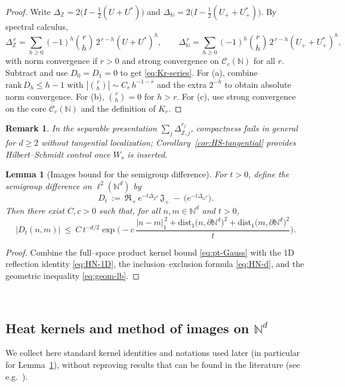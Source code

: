 \documentclass[10pt]{amsart}
\newcommand{\Z}{{\mathbb{Z}}}
\newcommand{\N}{{\mathbb{N}}}
\newcommand{\1}{{\mathbb{I}}}
\numberwithin{equation}{section}
\newtheorem{lemma}[theorem]{Lemma}%
\newtheorem{remark}[theorem]{Remark}%
\begin{document}
\begin{proof}
Write $\Delta_{\Z}=2\bigl(I-\tfrac{1}{2}(U+U^*)\bigr)$ and $\Delta_{\N}=2\bigl(I-\tfrac12(U_+ + U_+^*)\bigr)$.
By spectral calculus,
\[
\Delta_{\Z}^{\,r}= \sum_{h\ge 0}(-1)^h\binom{r}{h}\,2^{\,r-h}(U+U^*)^{h},\qquad
\Delta_{\N}^{\,r}= \sum_{h\ge 0}(-1)^h\binom{r}{h}\,2^{\,r-h}(U_+ + U_+^*)^{h},
\]
with norm convergence if $r>0$ and strong convergence on $\mathcal{C}_c(\N)$ for all $r$.
Subtract and use $D_0=D_1=0$ to get \eqref{eq:Kr-series}.
For (a), combine $\mathrm{rank}\,D_h\le h-1$ with $|\binom{r}{h}|\sim C_r\,h^{-1-r}$ and the extra $2^{-h}$ to obtain absolute norm convergence.
For (b), $\binom{r}{h}=0$ for $h>r$.
For (c), use strong convergence on the core $\mathcal{C}_c(\N)$ and the definition of $K_r$.
\end{proof}

\begin{remark}
In the separable presentation $\sum_j \Delta_{\Z,j}^{r_j}$, compactness fails in general for $d\ge2$ without tangential localization;
Corollary~\ref{cor:HS-tangential} provides Hilbert--Schmidt control once $W_s$ is inserted.
\end{remark}

\begin{lemma}[Images bound for the semigroup difference]\label{lem:images-bound}
For $t>0$, define the \emph{semigroup difference} on $\ell^2(\N^d)$ by
\[
D_t\ :=\ \mathfrak{R}_+\,e^{-t\Delta_{\Z^d}}\,\mathfrak{J}_+\ -\ \big(e^{-t\Delta_{\N^d}}\big).
\]
Then there exist $C,c>0$ such that, for all $n,m\in\N^d$ and $t>0$,
\[
|D_t(n,m)|\ \le\ C\,t^{-d/2}\exp\!\Bigg(-c\,\frac{|n-m|_1^{\,2}
+ \mathrm{dist}_1\!\big(n,\partial\N^d\big)^{2}
+ \mathrm{dist}_1\!\big(m,\partial\N^d\big)^{2}}{t}\Bigg).
\]
\end{lemma}

\begin{proof}
Combine the full--space product kernel bound \eqref{eq:pt-Gauss} with the 1D reflection identity \eqref{eq:HN-1D},
the inclusion--exclusion formula \eqref{eq:HN-d}, and the geometric inequality \eqref{eq:geom-lb}.
\end{proof}



\
\subsection{Heat kernels and method of images on $\mathbb{N}^d$}
\label{subsec:heat-images}

We collect here standard kernel identities and notations used later
(in particular for Lemma~\ref{lem:images-bound}), without reproving
results that can be found in the literature
(see e.g.~\cite{Spitzer1976,LawlerLimic2010,Woess2000,CarlenKusuokaStroock1987,Delmotte1999,Davies1989,CiprianiGrillo2022,LenzVogt2012}).
\end{document}
